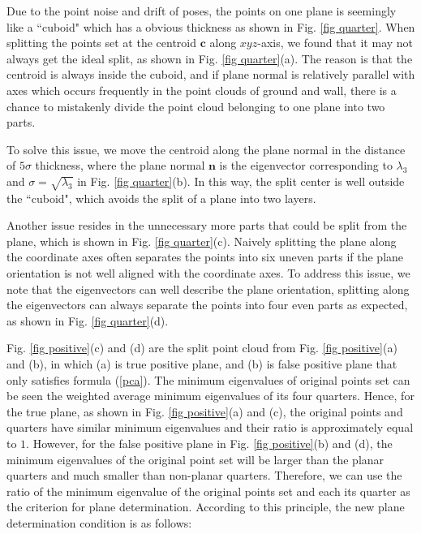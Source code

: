 \documentclass[letterpaper, 10 pt, conference]{ieeeconf}  %
\begin{document}
Due to the point noise and drift of poses, the points on one plane is seemingly like a ``cuboid" which has a obvious thickness as shown in Fig. \ref{fig quarter}. When splitting the points set at the centroid $\mathbf c$ along $xyz$-axis, we found that it may not always get the ideal split, as shown in Fig. \ref{fig quarter}(a). The reason is that the centroid is always inside the cuboid, and if plane normal is relatively parallel with axes which occurs frequently in the point clouds of ground and wall, there is a chance to mistakenly divide the point cloud belonging to one plane into two parts. 

To solve this issue, we move the centroid along the plane normal in the distance of $5\sigma$ thickness, where the plane normal $\mathbf n$ is the eigenvector corresponding to $\lambda_3$ and $\sigma = \sqrt{\lambda_3}$ in Fig. \ref{fig quarter}(b). In this way, the split center is well outside the ``cuboid", which avoids the split of a plane into two layers. 

{Another issue resides in the unnecessary more parts that could be split from the plane, which is shown in Fig.} \ref{fig quarter}(c). {Naively splitting the plane along the coordinate axes often separates the points into six uneven parts if the plane orientation is not well aligned with the coordinate axes. To address this issue, we note that the eigenvectors can well describe the plane orientation, splitting along the eigenvectors can always separate the points into four even parts as expected, as shown in Fig.} \ref{fig quarter}(d). 

Fig. \ref{fig positive}(c) and (d) are the split point cloud from Fig. \ref{fig positive}(a) and (b), in which (a) is true positive plane, and (b) is false positive plane that only satisfies formula (\ref{pca}). {The minimum eigenvalues of original points set can be seen the weighted average minimum eigenvalues of its four quarters. Hence, for the true plane, as shown in Fig. \ref{fig positive}(a) and (c), the original points and quarters have similar minimum eigenvalues and their ratio is approximately equal to $1$. However, for the false positive plane in Fig. \ref{fig positive}(b) and (d), the minimum eigenvalues of the original point set will be larger than the planar quarters and much smaller than non-planar quarters. Therefore, we can use the ratio of the minimum eigenvalue of the original points set and each its quarter as the criterion for plane determination.} According to this principle, the new plane determination condition is as follows:
\end{document}
